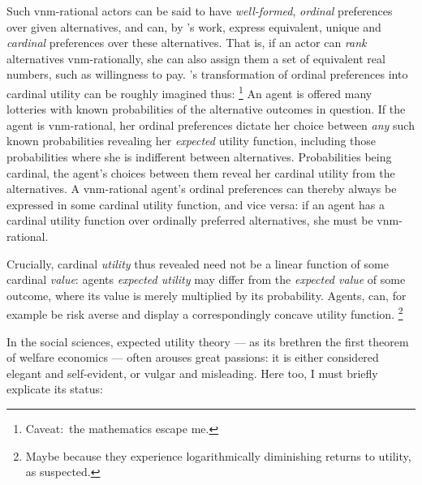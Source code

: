 Such \gls{vnm}-rational actors can be said to have \emph{well-formed}, \emph{ordinal} preferences over given alternatives, and can, by \citeauthor{VonNeumannMorgenstern1944}'s work, express equivalent, unique and \emph{cardinal} preferences over these alternatives.
That is, if an actor can \emph{rank} alternatives \gls{vnm}-rationally, she can also assign them a set of equivalent real numbers, such as willingness to pay.
\citeauthor{VonNeumannMorgenstern1944}'s transformation of ordinal preferences into cardinal utility can be roughly imagined thus:
\footnote{
	Caveat:\ the mathematics escape me.
}
An agent is offered many lotteries with known probabilities of the alternative outcomes in question.
If the agent is \gls{vnm}-rational, her ordinal preferences dictate her choice between \emph{any} such known probabilities revealing her \emph{expected} utility function, including those probabilities where she is indifferent between alternatives.
Probabilities being cardinal, the agent's choices between them reveal her cardinal utility from the alternatives.
A \gls{vnm}-rational agent's ordinal preferences can thereby always be expressed in some cardinal utility function, and vice versa:
if an agent has a cardinal utility function over ordinally preferred alternatives, she must be \gls{vnm}-rational.

Crucially, cardinal \emph{utility} thus revealed need not be a linear function of some cardinal \emph{value}:
agents \emph{expected utility} may differ from the \emph{expected value} of some outcome, where its value is merely multiplied by its probability.
Agents, can, for example be risk averse and display a correspondingly concave utility function.
\footnote{
	Maybe because they experience logarithmically diminishing returns to utility, as \cite{Bernoulli1738} suspected.
}

In the social sciences, expected utility theory --- as its brethren the first theorem of welfare economics --- often arouses great passions:
it is either considered elegant and self-evident, or vulgar and misleading.
Here too, I must briefly explicate its status:

